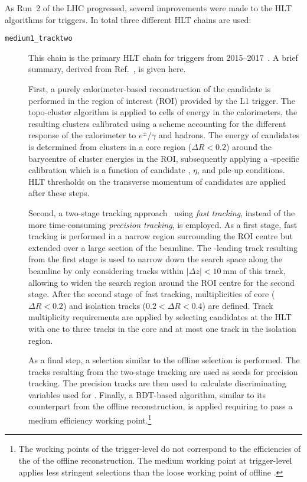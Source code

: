 As Run~2 of the LHC progressed, several improvements were made to the
HLT algorithms for \tauhadvis triggers. In total three different
\tauhadvis HLT chains are used:
\begin{description}

\item[\texttt{medium1\_tracktwo}] This chain is the primary HLT chain
  for \tauhadvis triggers from
  2015--2017~\cite{ATL-DAQ-PUB-2016-001,ATL-DAQ-PUB-2017-001,ATL-DAQ-PUB-2018-002}. A
  brief summary, derived from Ref.~\cite{ATLAS-CONF-2017-061}, is
  given here.

  First, a purely calorimeter-based reconstruction of the \tauhadvis
  candidate is performed in the region of interest (ROI) provided by
  the L1 trigger. The topo-cluster algorithm is applied to cells of
  energy in the calorimeters, the resulting clusters calibrated using
  a scheme accounting for the different response of the calorimeter to
  $e^\pm$/$\gamma$ and hadrons. The energy of \tauhadvis candidates is
  determined from clusters in a core region ($\Delta R < 0.2$) around
  the barycentre of cluster energies in the ROI, subsequently applying
  a \tauhadvis-specific calibration which is a function of \tauhadvis
  candidate \pT, $\eta$, and pile-up conditions. HLT thresholds on the
  transverse momentum of \tauhadvis candidates are applied after these
  steps.

  Second, a two-stage tracking
  approach~\cite{TRIG-2016-01,ATLAS-CONF-2017-061} using \emph{fast
    tracking}, instead of the more time-consuming \emph{precision
    tracking}, is employed. As a first stage, fast tracking is
  performed in a narrow region surrounding the \tauhadvis ROI centre
  but extended over a large section of the beamline. The \pT-leading
  track resulting from the first stage is used to narrow down the
  search space along the beamline by only considering tracks within
  $|\Delta z| < \SI{10}{\milli\metre}$ of this track, allowing to
  widen the search region around the ROI centre for the second
  stage. After the second stage of fast tracking, multiplicities of
  core ($\Delta R < 0.2$) and isolation tracks
  ($0.2 < \Delta R < 0.4$) are defined. Track multiplicity
  requirements are applied by selecting \tauhadvis candidates at the
  HLT with one to three tracks in the core and at most one track in
  the isolation region.

  As a final step, a \tauhadvis selection similar to the offline
  \tauhadvis selection is performed. The tracks resulting from the
  two-stage tracking are used as seeds for precision tracking. The
  precision tracks are then used to calculate discriminating variables
  used for \tauid. Finally, a BDT-based \tauid algorithm, similar to
  its counterpart from the offline \tauhadvis reconstruction, is
  applied requiring \tauhadvis to pass a medium efficiency working
  point.\footnote{The working points of the trigger-level \tauid do
    not correspond to the efficiencies of the \tauid of the offline
    reconstruction. The medium working point at trigger-level applies
    less stringent selections than the loose working point of offline
    \tauid.}


\end{description}
